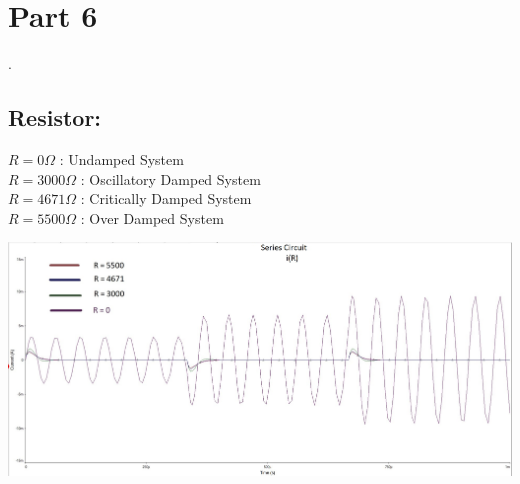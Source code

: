 \documentclass[a4paper,twoside]{report}
\newenvironment{Figure}
  {\par\medskip\minipage{\linewidth}}
  {\endminipage\par\medskip}
\begin{document}
    \section*{Part 6}\setlength{\parindent}{0pt}.
        \begin{multicols}{2}\setlength{\columnseprule}{0pt}
            \subsection*{Resistor:}
                    $R = 0\Omega$ : Undamped System \\
                    $R = 3000\Omega$ : Oscillatory Damped System \\
                    $R = 4671\Omega$ : Critically Damped System \\
                    $R = 5500\Omega$ : Over Damped System
                \vfill\null
                \columnbreak
                \begin{center}
                    \begin{Figure}
                        \includegraphics[width=\linewidth]{part6-resistor.jpg}
                    \end{Figure}
                \end{center}
        \end{multicols}
        \pagebreak
\end{document}
